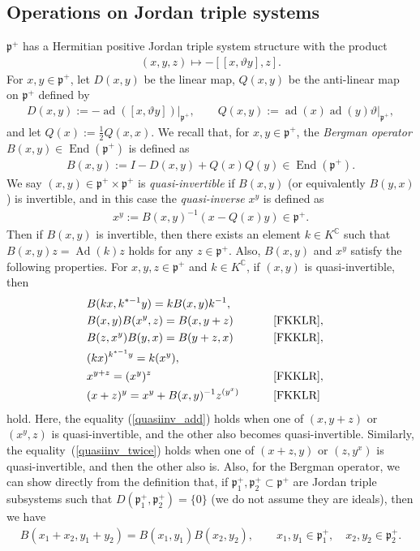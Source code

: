 \documentclass[pdftex]{sigma}
\numberwithin{equation}{section}
\newcommand{\BC}{\mathbb{C}}
\newcommand{\fp}{\mathfrak{p}}
\newcommand{\End}{\operatorname{End}}
\begin{document}
\subsection{Operations on Jordan triple systems}
$\fp^+$ has a Hermitian positive Jordan triple system structure with the product
\begin{gather*} (x,y,z)\mapsto -[[x,\vartheta y],z]. \end{gather*}
For $x,y\in\fp^+$, let $D(x,y)$ be the linear map, $Q(x,y)$ be the anti-linear map on $\fp^+$ defined by
\begin{gather*} D(x,y):=-\operatorname{ad}([x,\vartheta y])\bigr|_{\fp^+},\qquad Q(x,y):=\operatorname{ad}(x)\operatorname{ad}(y)\vartheta\bigr|_{\fp^+}, \end{gather*}
and let $Q(x):=\frac{1}{2}Q(x,x)$.
We recall that, for $x,y\in\fp^+$, the \textit{Bergman operator} $B(x,y)\in\End(\fp^+)$ is defined as
\begin{gather*} B(x,y):=I-D(x,y)+Q(x)Q(y)\in\End(\fp^+). \end{gather*}
We say $(x,y)\in\fp^+\times\fp^+$ is \textit{quasi-invertible} if $B(x,y)$ (or equivalently $B(y,x)$) is invertible,
and in this case the \textit{quasi-inverse} $x^y$ is defined as
\begin{gather*} x^y:=B(x,y)^{-1} \left(x-Q(x)y\right)\in\fp^+. \end{gather*}
Then if $B(x,y)$ is invertible, then there exists an element $k\in K^\BC$ such that $B(x,y)z=\operatorname{Ad}(k)z$ holds for any $z\in\fp^+$.
Also, $B(x,y)$ and $x^y$ satisfy the following properties. For $x,y,z\in\fp^+$ and $k\in K^\BC$, if $(x,y)$ is quasi-invertible, then
\begin{alignat}{3}
& B(kx,k^{*-1}y) =kB(x,y)k^{-1}, &&\label{Bergman_k}\\
& B(x,y)B(x^y,z) =B(x,y+z) \qquad & & \text{\cite[Part V, Proposition III.3.1, (J6.4)]{FKKLR}},&\label{Bergman_left}\\
& B(z,x^y)B(y,x) =B(y+z,x) \qquad & & \text{\cite[Part V, Proposition III.3.1, (J6.4$'$)]{FKKLR}},&\label{Bergman_right}\\
& (kx)^{k^{*-1}y} =k(x^y), &&& \label{quasiinv_k}\\
& x^{y+z} =(x^y)^z \qquad & & \text{\cite[Part V, Theorem III.5.1(i)]{FKKLR}},& \label{quasiinv_add}\\
&(x+z)^y=x^y+B(x,y)^{-1}z^{(y^x)} \qquad & & \text{\cite[Part V, Theorem III.5.1(ii)]{FKKLR}}& \label{quasiinv_twice}
\end{alignat}
hold. Here, the equality (\ref{quasiinv_add}) holds when one of $(x,y+z)$ or $(x^y,z)$ is quasi-invertible,
and the other also becomes quasi-invertible. Similarly, the equality~(\ref{quasiinv_twice}) holds when one of $(x+z,y)$ or $(z,y^x)$ is
quasi-invertible, and then the other also is. Also, for the Bergman operator, we can show directly from the definition that,
if $\fp^+_1,\fp^+_2\subset \fp^+$ are Jordan triple subsystems such that $D(\fp^+_1,\fp^+_2)=\{0\}$ (we do not assume they are ideals),
then we have
\begin{gather}\label{Bergman_decomp}
B(x_1+x_2,y_1+y_2)=B(x_1,y_1)B(x_2,y_2), \qquad x_1,y_1\in\fp^+_1, \quad x_2,y_2\in\fp^+_2.
\end{gather}
\end{document}
